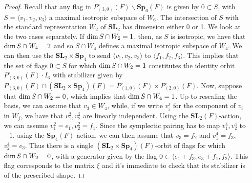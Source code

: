 \documentclass[11pt, reqno]{amsart}
\theoremstyle{plain}
\theoremstyle{definition}
\theoremstyle{remark}
\theoremstyle{plain}
\def\SL{{\mathbf{SL}}}
\def\Sp{{\mathbf{Sp}}}
\begin{document}
\begin{proof}
Recall that any flag in $P_{(3,0)}^\circ(F) \backslash \Sp_6(F)$ is given by $0 \subset S$, with $S=\langle v_1,v_2,v_3\rangle$ a maximal isotropic subspace of $W_6$. The intersection of $S$ with the standard representation $W_2$ of $\SL_2$ has dimension either 0 or 1. We look at the two cases separately. If ${\rm dim}\, S \cap W_2 = 1$, then, as $S$ is isotropic, we have that ${\rm dim}\, S \cap W_4 = 2$ and so $S \cap W_4$ defines a maximal isotropic subspace of $W_4$. We can then use the $\SL_2 \times \Sp_4$ to send $\langle v_1,v_2,v_3\rangle$ to $\langle f_1,f_2,f_3\rangle$. This implies that the set of flags $0 \subset S$ for which ${\rm dim}\, S \cap W_2 = 1$ constitutes the identity orbit $P_{(3,0)}^\circ(F) \cdot I_6 $ with stabilizer given by $P_{(3,0)}^\circ(F) \cap (\SL_2 \times \Sp_4)(F) = P_{(1,0)}^\circ(F) \times P_{(2,0)}^\circ(F)$. 
Now, suppose that ${\rm dim}\, S \cap W_2 = 0$, which implies that ${\rm dim}\, S \cap W_4 = 1$. Up to rescaling the basis, we can assume that $v_3 \in W_4$, while, if we write $v_i^j$ for the component of $v_i$ in $W_j$, we have that $v_1^2,v_2^2$ are linearly independent. Using the $\SL_2(F)$-action, we can assume $v_1^2=e_1,v_2^2=f_1$. Since the symplectic pairing has to map $v_1^4,v_2^4$ to $-1$, using the $\Sp_4(F)$-action, we can then assume that $v_3 = f_2$ and $v_1^4=f_3$, $v_2^4=e_3$. Thus there is a single $(\SL_2 \times \Sp_4)(F)$-orbit of flags for which ${\rm dim}\, S \cap W_2 = 0$, with a generator given by the flag $0 \subset \langle e_1 + f_3, e_3 + f_1, f_2 \rangle$. This flag corresponds to the matrix $\xi$ and it's  immediate to check that its stabilizer is of the prescribed shape.
\end{proof}
\end{document}
